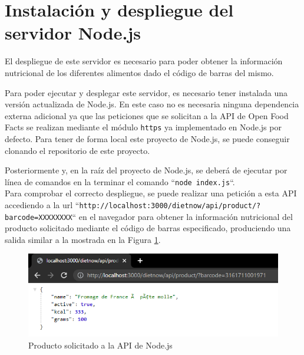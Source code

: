\section{Instalación y despliegue del servidor Node.js}
El despliegue de este servidor es necesario para poder obtener la información nutricional de los diferentes alimentos dado el código de barras del mismo.

Para poder ejecutar y desplegar este servidor, es necesario tener instalada una versión actualizada de Node.js. En este caso no es necesaria ninguna dependencia externa adicional ya que las peticiones que se solicitan a la API de Open Food Facts se realizan mediante el módulo \texttt{https} ya implementado en Node.js por defecto. Para tener de forma local este proyecto de Node.js, se puede conseguir clonando el repositorio de este proyecto.

Posteriormente y, en la raíz del proyecto de Node.js, se deberá de ejecutar por línea de comandos en la terminar el comando ``\texttt{node index.js}``.\\
Para comprobar el correcto despliegue, se puede realizar una petición a esta API accediendo a la url ``\texttt{http://localhost:3000/dietnow/api/product/?barcode=XXXXXXXX}`` en el navegador para obtener la información nutricional del producto solicitado mediante el código de barras especificado, produciendo una salida similar a la mostrada en la Figura \ref{fig:node}.

\begin{figure}[H]
    \centering
    \includegraphics[width=\textwidth]{Images/Annexes/node.png}
    \caption{Producto solicitado a la API de Node.js}
    \label{fig:node}
\end{figure}